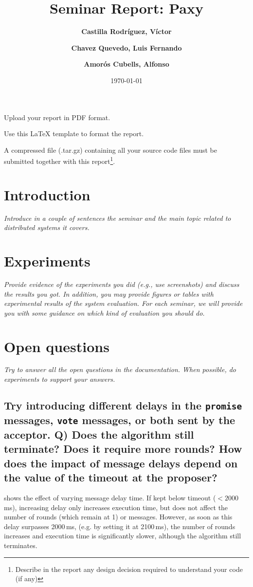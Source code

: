\documentclass[a4paper, 10pt]{article}
\title{Seminar Report: Paxy}
\author{ \textbf{Castilla Rodríguez, Víctor} \and \textbf{Chavez Quevedo, Luis Fernando} \and \textbf{Amorós Cubells, Alfonso}
}
\date{\normalsize\today{}}
\begin{document}
\maketitle

\begin{center}
  Upload your report in PDF format.

  Use this LaTeX template to format the report.

	A compressed file (.tar.gz) containing all your source code files must be submitted together with this report\footnote{Describe in the report any design decision required to understand your code (if any)}.
\end{center}

\section{Introduction}

\textit{Introduce in a couple of sentences the seminar and the main topic related to distributed systems it covers.}

\section{Experiments}

\textit{Provide evidence of the experiments you did (e.g., use screenshots) and discuss the results you got. In addition, you may provide figures or tables with experimental results of the system evaluation. For each seminar, we will provide you with some guidance on which kind of evaluation you should do.}

\section{Open questions}

\textit{Try to answer all the open questions in the documentation. When possible, do experiments to support your answers.}

\subsection{Try introducing different delays in the
\texttt{promise} messages, \texttt{vote} messages, or both sent by the acceptor. Q) Does the
algorithm still terminate? Does it require more rounds? How does the impact
of message delays depend on the value of the timeout at the proposer?}

 shows the effect of varying message delay time.
If kept below timeout (\(< 2000\)\,ms), increasing delay only increases execution time, but does not affect the number of rounds (which remain at 1) or messages.
However, as soon as this delay surpasses 2000\,ms, (e.g. by setting it at 2100\,ms), the number of rounds increases and execution time is significantly slower, although the algorithm still terminates.
\end{document}
